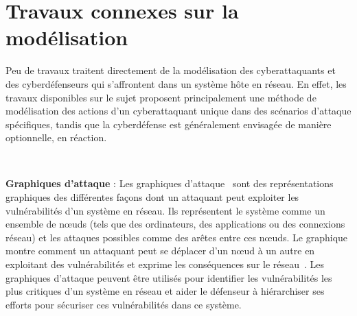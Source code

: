 
\section{Travaux connexes sur la modélisation}

\noindent

Peu de travaux traitent directement de la modélisation des cyberattaquants et des cyberdéfenseurs qui s'affrontent dans un système hôte en réseau. En effet, les travaux disponibles sur le sujet proposent principalement une méthode de modélisation des actions d'un cyberattaquant unique dans des scénarios d'attaque spécifiques, tandis que la cyberdéfense est généralement envisagée de manière optionnelle, en réaction.


\

\noindent
\textbf{Graphiques d'attaque} : \quad Les graphiques d'attaque~\cite{CPhilips1998} sont des représentations graphiques des différentes façons dont un attaquant peut exploiter les vulnérabilités d'un système en réseau. Ils représentent le système comme un ensemble de nœuds (tels que des ordinateurs, des applications ou des connexions réseau) et les attaques possibles comme des arêtes entre ces nœuds. Le graphique montre comment un attaquant peut se déplacer d'un nœud à un autre en exploitant des vulnérabilités et exprime les conséquences sur le réseau~\cite{CPhilips1998}.
Les graphiques d'attaque peuvent être utilisés pour identifier les vulnérabilités les plus critiques d'un système en réseau et aider le défenseur à hiérarchiser ses efforts pour sécuriser ces vulnérabilités dans ce système.

